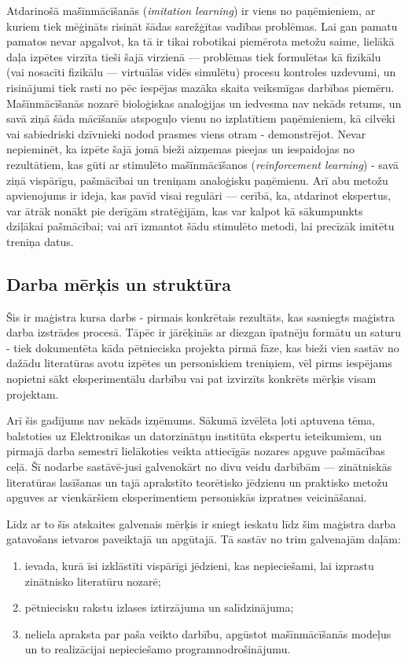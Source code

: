 \documentclass[12pt, a4paper]{article}
\numberwithin{equation}{section} %
\begin{document}
Atdarinošā mašīnmācīšanās (\textit{imitation learning}) ir viens no paņēmieniem, ar kuriem tiek mēģināts risināt šādas sarežģītas vadības problēmas. Lai gan pamatu pamatos nevar apgalvot, ka tā ir tikai robotikai piemērota metožu saime, lielākā daļa izpētes virzīta tieši šajā virzienā --- problēmas tiek formulētas kā fizikālu (vai nosacīti fizikālu --- virtuālās vidēs simulētu) procesu kontroles uzdevumi, un risinājumi tiek rasti no pēc iespējas mazāka skaita veiksmīgas darbības piemēru. Mašīnmācīšanās nozarē bioloģiskas analoģijas un iedvesma nav nekāds retums, un savā ziņā šāda mācīšanās  atspoguļo vienu no izplatītiem paņēmieniem, kā cilvēki vai sabiedriski dzīvnieki nodod prasmes viens otram - demonstrējot. Nevar nepieminēt, ka izpēte šajā jomā bieži aizņemas pieejas un iespaidojas no rezultātiem, kas gūti ar stimulēto mašīnmācīšanos (\textit{reinforcement learning}) - savā ziņā vispārīgu, pašmācībai un treniņam analoģisku paņēmienu. Arī abu metožu apvienojums ir ideja, kas pavīd visai regulāri --- cerībā, ka, atdarinot ekspertus, var ātrāk nonākt pie derīgām stratēģijām, kas var kalpot kā sākumpunkts dziļākai pašmācībai; vai arī izmantot šādu stimulēto metodi, lai precīzāk imitētu treniņa datus.


\subsection{Darba mērķis un struktūra}

Šis ir maģistra kursa darbs - pirmais konkrētais rezultāts, kas sasniegts maģistra darba izstrādes procesā. Tāpēc ir jārēķinās ar diezgan īpatnēju formātu un saturu - tiek dokumentēta kāda pētnieciska projekta pirmā fāze, kas bieži vien sastāv no dažādu literatūras avotu izpētes un personiskiem treniņiem, vēl pirms iespējams nopietni sākt eksperimentālu darbību vai pat izvirzīts konkrēts mērķis visam projektam.

Arī šis gadījums nav nekāds izņēmums. Sākumā izvēlēta ļoti aptuvena tēma, balstoties uz Elektronikas un datorzinātņu institūta ekspertu ieteikumiem, un pirmajā darba semestrī lielākoties veikta attiecīgās nozares apguve pašmācības ceļā. Šī nodarbe sastāvē-jusi galvenokārt no divu veidu darbībām --- zinātniskās literatūras lasīšanas un tajā aprakstīto teorētisko jēdzienu un praktisko metožu apguves ar vienkāršiem eksperimentiem personiskās izpratnes veicināšanai.

Līdz ar to šīs atskaites galvenais mērķis ir sniegt ieskatu līdz šim maģistra darba gatavošans ietvaros paveiktajā un apgūtajā. Tā sastāv no trim galvenajām daļām:
\begin{enumerate}
    \item ievada, kurā īsi izklāstīti vispārīgi jēdzieni, kas nepieciešami, lai izprastu zinātnisko literatūru nozarē;
    \item pētniecisku rakstu izlases iztirzājuma un salīdzinājuma;
    \item neliela apraksta par paša veikto darbību, apgūstot mašīnmācīšanās modeļus un to realizācijai nepieciešamo programnodrošinājumu.
\end{enumerate}
\end{document}

